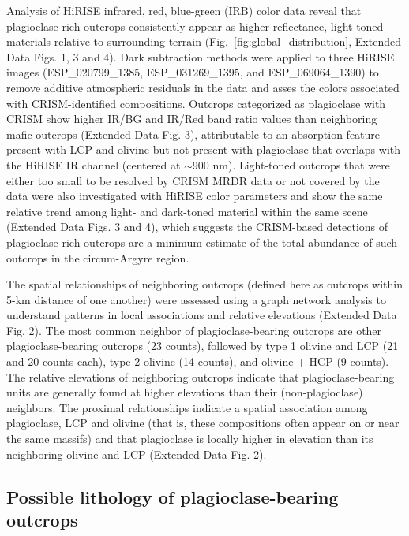 \documentclass[12pt]{article}
\begin{document}
Analysis of HiRISE infrared, red, blue-green (IRB) color data reveal that plagioclase-rich outcrops consistently appear as higher reflectance, light-toned materials relative to surrounding terrain (Fig.~\ref{fig:global_distribution}, Extended Data Figs. 1, 3 and 4). Dark subtraction methods \citep{Tornabene2018} were applied to three HiRISE images (ESP\_020799\_1385, ESP\_031269\_1395, and ESP\_069064\_1390) to remove additive atmospheric residuals in the data and asses the colors associated with CRISM-identified compositions. Outcrops categorized as plagioclase with CRISM show higher IR/BG and IR/Red band ratio values than neighboring mafic outcrops (Extended Data Fig. 3), attributable to an absorption feature present with LCP and olivine but not present with plagioclase that overlaps with the HiRISE IR channel (centered at $\sim$900 nm). Light-toned outcrops that were either too small to be resolved by CRISM MRDR data or not covered by the data were also investigated with HiRISE color parameters and show the same relative trend among light- and dark-toned material within the same scene (Extended Data Figs. 3 and 4), which suggests the CRISM-based detections of plagioclase-rich outcrops are a minimum estimate of the total abundance of such outcrops in the circum-Argyre region.

The spatial relationships of neighboring outcrops (defined here as outcrops within 5-km distance of one another) were assessed using a graph network analysis to understand patterns in local associations and relative elevations (Extended Data Fig. 2). The most common neighbor of plagioclase-bearing outcrops are other plagioclase-bearing outcrops (23 counts), followed by type 1 olivine and LCP (21 and 20 counts each), type 2 olivine (14 counts), and olivine + HCP (9 counts). The relative elevations of neighboring outcrops indicate that plagioclase-bearing units are generally found at higher elevations than their (non-plagioclase) neighbors. The proximal relationships indicate a spatial association among plagioclase, LCP and olivine (that is, these compositions often appear on or near the same massifs) and that plagioclase is locally higher in elevation than its neighboring olivine and LCP (Extended Data Fig. 2).

\subsection*{Possible lithology of plagioclase-bearing outcrops}
\end{document}
